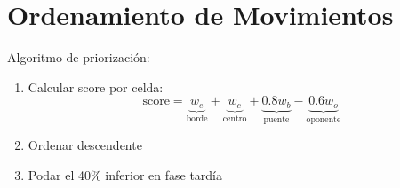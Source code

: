 \documentclass{article}
\begin{document}
\section{Ordenamiento de Movimientos}
Algoritmo de priorización:
\begin{enumerate}
    \item Calcular score por celda: 
    \begin{equation*}
        \text{score} = \underbrace{w_e}_{\text{borde}} + \underbrace{w_c}_{\text{centro}} + \underbrace{0.8w_b}_{\text{puente}} - \underbrace{0.6w_o}_{\text{oponente}}
    \end{equation*}
    \item Ordenar descendente
    \item Podar el 40\% inferior en fase tardía
\end{enumerate}
\end{document}
